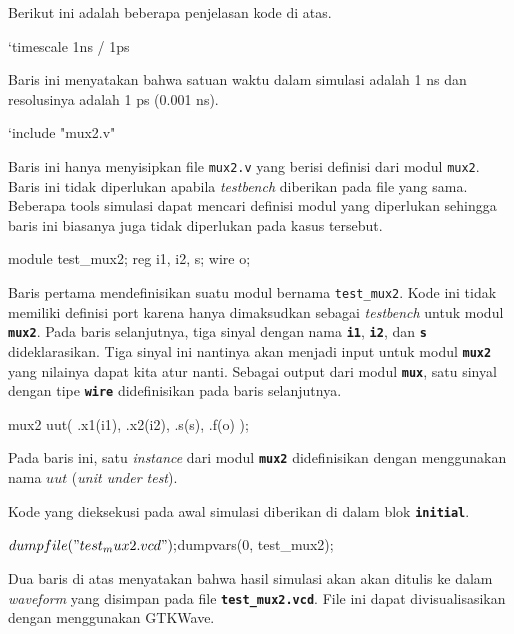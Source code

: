 Berikut ini adalah beberapa penjelasan kode di atas.

\begin{verilogcode}
`timescale 1ns / 1ps
\end{verilogcode}
Baris ini menyatakan bahwa satuan waktu dalam simulasi adalah 1 ns dan
resolusinya adalah 1 ps (0.001 ns).

\begin{verilogcode}
`include "mux2.v"
\end{verilogcode}
Baris ini hanya menyisipkan file {\tt mux2.v} yang berisi definisi dari modul {\tt mux2}.
Baris ini tidak diperlukan apabila \textit{testbench} diberikan pada file yang sama.
Beberapa tools simulasi dapat mencari definisi modul yang diperlukan sehingga
baris ini biasanya juga tidak diperlukan pada kasus tersebut.

\begin{verilogcode}
module test_mux2;
  reg i1, i2, s;
  wire o;
\end{verilogcode}

Baris pertama mendefinisikan suatu modul bernama {\tt\small test\_mux2}. Kode
ini tidak memiliki definisi port karena hanya dimaksudkan sebagai {\it testbench}
untuk modul {\tt\textbf{mux2}}. Pada baris selanjutnya,
tiga sinyal dengan nama {\tt\textbf{i1}}, {\tt\textbf{i2}},
dan {\tt\textbf{s}} dideklarasikan. Tiga sinyal ini nantinya akan menjadi input untuk
modul {\tt\textbf{mux2}}
yang nilainya dapat kita atur nanti.
Sebagai output dari modul {\tt\textbf{mux}}, satu sinyal dengan tipe {\tt\textbf{wire}}
didefinisikan pada baris selanjutnya.

\begin{verilogcode}
  mux2 uut( .x1(i1), .x2(i2), .s(s), .f(o) );
\end{verilogcode}

Pada baris ini, satu \textit{instance} dari modul {\tt\textbf{mux2}} didefinisikan
dengan menggunakan nama $uut$ (\textit{unit under test}).

Kode yang dieksekusi pada awal simulasi diberikan di dalam blok
{\tt\textbf{initial}}.

\begin{verilogcode}
  $dumpfile("test_mux2.vcd");
  $dumpvars(0, test_mux2);
\end{verilogcode}

Dua baris di atas menyatakan bahwa hasil simulasi akan akan ditulis
ke dalam \textit{waveform} yang disimpan pada file {\tt\textbf{test\_mux2.vcd}}.
File ini dapat divisualisasikan dengan menggunakan {\sf GTKWave}.

